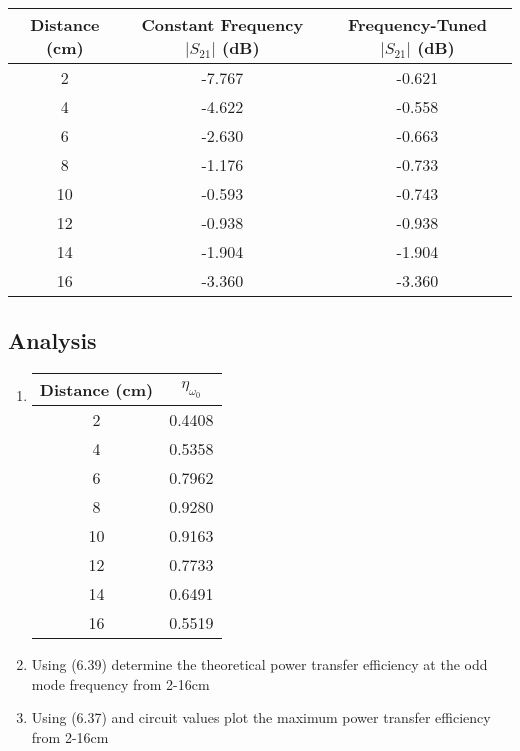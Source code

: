 \documentclass{article}
\begin{document}
\begin{table}[H]
\centering
\begin{tabular}{|c|c|c|}
\hline
Distance (cm) & Constant Frequency $\vert S_{21}\vert$ (dB) 
& Frequency-Tuned $\vert S_{21}\vert$ (dB) \\ \hline
2             & -7.767                          & -0.621                       \\ \hline
4             & -4.622                          & -0.558                       \\ \hline
6             & -2.630                          & -0.663                       \\ \hline
8             & -1.176                          & -0.733                       \\ \hline
10            & -0.593                          & -0.743                       \\ \hline
12            & -0.938                          & -0.938                       \\ \hline
14            & -1.904                          & -1.904                       \\ \hline
16            & -3.360                          & -3.360                       \\ \hline
\end{tabular}
\end{table}

\subsection{Analysis}

\begin{enumerate}
	\item
	\begin{table}[h]
	\centering
		\begin{tabular}{|c|c|}
		\hline
		Distance (cm) & $\eta_{\omega_0}$  \\ \hline
		2             & 0.4408  \\ \hline
		4             & 0.5358  \\ \hline
		6             & 0.7962  \\ \hline
		8             & 0.9280  \\ \hline
		10            & 0.9163  \\ \hline
		12            & 0.7733  \\ \hline
		14            & 0.6491  \\ \hline
		16            & 0.5519  \\ \hline
		\end{tabular}
	\end{table}

	\item Using (6.39) determine the theoretical power transfer efficiency at the odd mode frequency from 2-16cm
	\item Using (6.37) and circuit values plot the maximum power transfer efficiency from 2-16cm
\end{enumerate}
\end{document}

